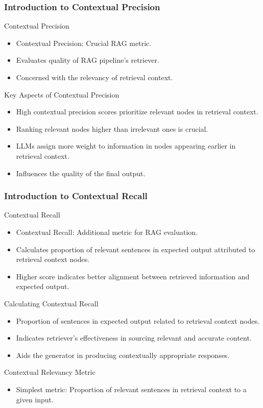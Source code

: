 \begin{frame}[fragile]\frametitle{Introduction to Contextual Precision}
Contextual Precision
  \begin{itemize}
    \item Contextual Precision: Crucial RAG metric.
    \item Evaluates quality of RAG pipeline's retriever.
    \item Concerned with the relevancy of retrieval context.
  \end{itemize}
Key Aspects of Contextual Precision
  \begin{itemize}
    \item High contextual precision scores prioritize relevant nodes in retrieval context.
    \item Ranking relevant nodes higher than irrelevant ones is crucial.
    \item LLMs assign more weight to information in nodes appearing earlier in retrieval context.
    \item Influences the quality of the final output.
  \end{itemize}
\end{frame}

\begin{frame}[fragile]\frametitle{Introduction to Contextual Recall}
Contextual Recall
  \begin{itemize}
    \item Contextual Recall: Additional metric for RAG evaluation.
    \item Calculates proportion of relevant sentences in expected output attributed to retrieval context nodes.
    \item Higher score indicates better alignment between retrieved information and expected output.
  \end{itemize}
Calculating Contextual Recall
  \begin{itemize}
    \item Proportion of sentences in expected output related to retrieval context nodes.
    \item Indicates retriever's effectiveness in sourcing relevant and accurate content.
    \item Aids the generator in producing contextually appropriate responses.
  \end{itemize}
Contextual Relevancy Metric 
  \begin{itemize}
    \item Simplest metric: Proportion of relevant sentences in retrieval context to a given input.
  \end{itemize} 
\end{frame}

